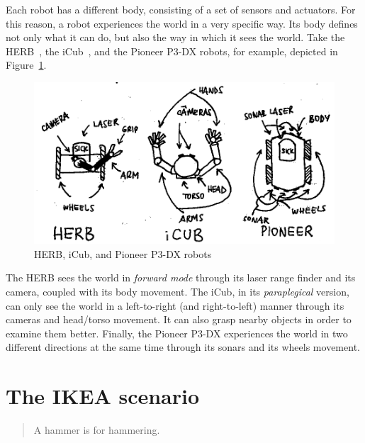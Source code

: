\documentclass{article}
\begin{document}

Each robot has a different body, consisting of a set of sensors and actuators. 
For this reason, a robot experiences the world in a very specific way. Its body
defines not only what it can do, but also the way in which it sees the world.
Take the HERB~\cite{srinivasa2009herb}, the iCub~\cite{metta2010icub}, and the
Pioneer P3-DX robots, for example, depicted in
Figure~\ref{fig:herb_icub_pioneer}.

\begin{figure}[h]
  \centering
  \includegraphics{figures/herb_icub_pioneer.png}
  \caption{HERB, iCub, and Pioneer P3-DX robots}
  \label{fig:herb_icub_pioneer}
\end{figure}

The HERB sees the world in \emph{forward mode} through its laser range finder
and its camera, coupled with its body movement. The iCub, in its
\emph{paraplegical} version, can only see the world in a left-to-right (and
right-to-left) manner through its cameras and head/torso movement. It can also
grasp nearby objects in order to examine them better. Finally, the Pioneer P3-DX
experiences the world in two different directions at the same time through its
sonars and its wheels movement. 


\section{The IKEA scenario}

\begin{quotation}
  A hammer is for hammering.
\end{quotation}
\end{document}
